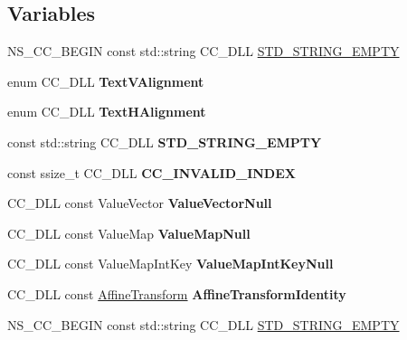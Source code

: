 \subsection*{Variables}
\begin{DoxyCompactItemize}
\item 
N\+S\+\_\+\+C\+C\+\_\+\+B\+E\+G\+IN const std\+::string C\+C\+\_\+\+D\+LL \hyperlink{group__base_gaf202814bc47389638c012459824ce39d}{S\+T\+D\+\_\+\+S\+T\+R\+I\+N\+G\+\_\+\+E\+M\+P\+TY}
\item 
\mbox{\label{group__base_ga4b95188c59c9adaba2929c784776110c}} 
enum C\+C\+\_\+\+D\+LL {\bfseries Text\+V\+Alignment}
\item 
\mbox{\label{group__base_gae13152ef574120d225b26dc47704ab22}} 
enum C\+C\+\_\+\+D\+LL {\bfseries Text\+H\+Alignment}
\item 
\mbox{\label{group__base_ga3948910b23b18f4175e7ed8ad42f7d5c}} 
const std\+::string C\+C\+\_\+\+D\+LL {\bfseries S\+T\+D\+\_\+\+S\+T\+R\+I\+N\+G\+\_\+\+E\+M\+P\+TY}
\item 
\mbox{\label{group__base_gaf6d0a4ec9f66c0f6a6cb80808f21a9a3}} 
const ssize\+\_\+t C\+C\+\_\+\+D\+LL {\bfseries C\+C\+\_\+\+I\+N\+V\+A\+L\+I\+D\+\_\+\+I\+N\+D\+EX}
\item 
\mbox{\label{group__base_ga5ea7e67358375e99654c5bfb9fc3f8c7}} 
C\+C\+\_\+\+D\+LL const Value\+Vector {\bfseries Value\+Vector\+Null}
\item 
\mbox{\label{group__base_ga8cee7c42f024c9ccc0c9dcc86c8c450e}} 
C\+C\+\_\+\+D\+LL const Value\+Map {\bfseries Value\+Map\+Null}
\item 
\mbox{\label{group__base_gaa515868a12cbd458cc3a1c239a31e70d}} 
C\+C\+\_\+\+D\+LL const Value\+Map\+Int\+Key {\bfseries Value\+Map\+Int\+Key\+Null}
\item 
\mbox{\label{group__base_ga3ea037ccb8f82eff2b09582e9f5125f4}} 
C\+C\+\_\+\+D\+LL const \hyperlink{structAffineTransform}{Affine\+Transform} {\bfseries Affine\+Transform\+Identity}
\item 
N\+S\+\_\+\+C\+C\+\_\+\+B\+E\+G\+IN const std\+::string C\+C\+\_\+\+D\+LL \hyperlink{group__base_gaf202814bc47389638c012459824ce39d}{S\+T\+D\+\_\+\+S\+T\+R\+I\+N\+G\+\_\+\+E\+M\+P\+TY}

\end{DoxyCompactItemize}
